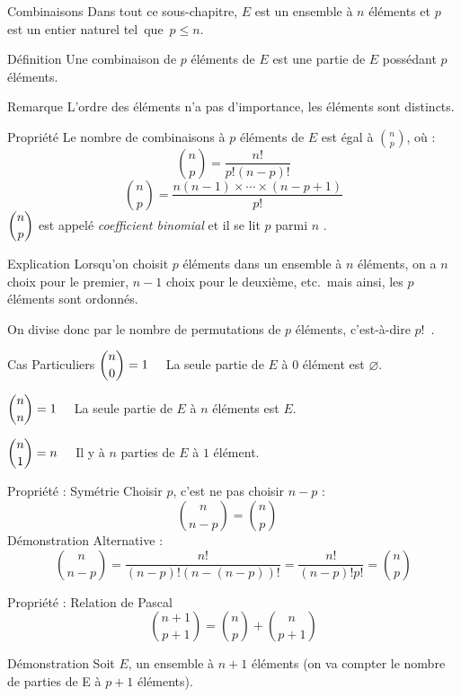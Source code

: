 \documentclass{cours}
\begin{document}
    \begin{Gpartie}{Combinaisons}
        Dans tout ce sous-chapitre, $E$ est un ensemble à $n$ éléments et $p$ est un entier naturel tel~que~$p\leq n$.
        \begin{Spartie}{Définition}
            Une combinaison de $p$ éléments de $E$ est une partie de $E$ possédant $p$ éléments.
            \begin{SSpartie}{Remarque}
                L'ordre des éléments n'a pas d'importance, les éléments sont distincts.
            \end{SSpartie}
        \end{Spartie}
        \begin{Spartie}{Propriété}
            Le nombre de combinaisons à $p$ éléments de $E$ est égal à $\binom{n}{p}$, où :
            \[\binom{n}{p}=\dfrac{n!}{p!(n-p)!}\]
            \[\binom{n}{p}=\dfrac{n(n-1)\times\dotsb\times(n-p+1)}{p!}\]
            $\dbinom{n}{p}$ est appelé \emph{coefficient binomial} et il se lit \og $p$ parmi $n$ \fg{}.
            \begin{SSpartie}{Explication}
                Lorsqu'on choisit $p$ éléments dans un ensemble à $n$ éléments, on a $n$ choix pour le premier, $n-1$ choix pour le deuxième, etc.\ mais ainsi, les $p$ éléments sont ordonnés.

                On divise donc par le nombre de permutations de $p$ éléments, c'est-à-dire $p!$~.
            \end{SSpartie}
            \begin{SSpartie}{Cas Particuliers}
                $\dbinom{n}{0}=1\quad$ La seule partie de $E$ à $0$ élément est $\varnothing$.

                $\dbinom{n}{n}=1\quad$ La seule partie de $E$ à $n$ éléments est $E$.

                $\dbinom{n}{1}=n\quad$ Il y à $n$ parties de $E$ à $1$ élément.
            \end{SSpartie}
        \end{Spartie}
        \begin{Spartie}{Propriété : Symétrie}
            Choisir $p$, c'est ne pas choisir $n-p$ :
            \[\binom{n}{n-p}=\binom{n}{p}\quad\]
            Démonstration Alternative : 
            \[\binom{n}{n-p}=\dfrac{n!}{(n-p)!(n-(n-p))!}=\dfrac{n!}{(n-p)!p!}=\binom{n}{p}\]
        \end{Spartie}
        \begin{Spartie}{Propriété : Relation de Pascal}
            \[\binom{n+1}{p+1}=\binom{n}{p}+\binom{n}{p+1}\]
            \begin{SSpartie}{Démonstration}
                Soit $E$, un ensemble à $n+1$ éléments (on va compter le nombre de parties de E à $p+1$ éléments).


\end{SSpartie}
\end{Spartie}
\end{Gpartie}
\end{document}
